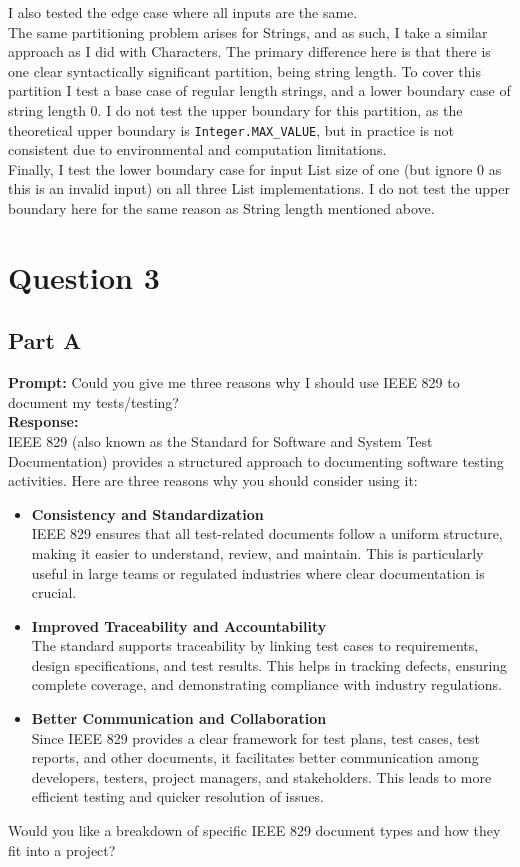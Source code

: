 \documentclass{article}
\begin{document}
I also tested the edge case where all inputs are the same.\medskip \\
The same partitioning problem arises for Strings, and as such, I take a similar approach as I did with Characters. The primary difference here is that there is one
clear syntactically significant partition, being string length. To cover this partition I test a base case of regular length strings, and a lower boundary case of string length 0.
I do not test the upper boundary for this partition, as the theoretical upper boundary is \lstinline{Integer.MAX_VALUE}, but in practice is not consistent due to environmental and
computation limitations.\medskip \\
Finally, I test the lower boundary case for input List size of one (but ignore 0 as this is an invalid input) on all three List implementations. I do not test the upper boundary here
for the same reason as String length mentioned above.\medskip \\
\section{Question 3}
\subsection{Part A}
\textbf{Prompt:} Could you give me three reasons why I should use IEEE 829 to document my tests/testing?\medskip \\
\textbf{Response:}\\
IEEE 829 (also known as the Standard for Software and System Test Documentation) provides a structured approach to documenting software testing activities. Here are three reasons why you should consider using it:
\begin{itemize}
	\item \textbf{Consistency and Standardization}\\ IEEE 829 ensures that all test-related documents follow a uniform structure, making it easier to understand, review, and maintain.
		This is particularly useful in large teams or regulated industries where clear documentation is crucial.

	\item \textbf{Improved Traceability and Accountability}\\ The standard supports traceability by linking test cases to requirements, design specifications, and test results.
		This helps in tracking defects, ensuring complete coverage, and demonstrating compliance with industry regulations.

	\item \textbf{Better Communication and Collaboration}\\ Since IEEE 829 provides a clear framework for test plans, test cases, test reports, and other documents, it facilitates better
		communication among developers, testers, project managers, and stakeholders. This leads to more efficient testing and quicker resolution of issues.
\end{itemize}
Would you like a breakdown of specific IEEE 829 document types and how they fit into a project?
\end{document}
